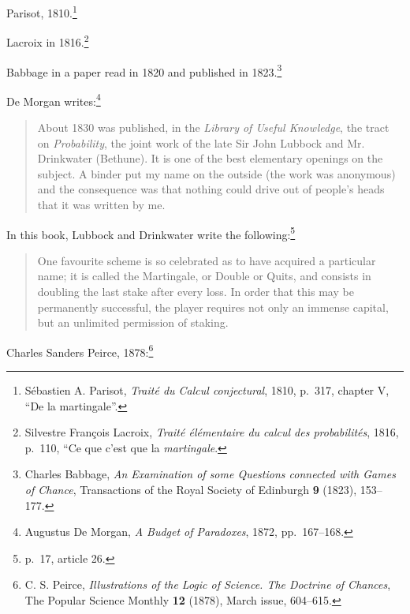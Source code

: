 \documentclass{article}
\theoremstyle{definition}
\begin{document}
Parisot, 1810.\footnote{S\'ebastien A. Parisot, {\em Trait\'e du Calcul conjectural}, 1810, p.~317, chapter V, ``De la martingale''.}

Lacroix in 1816.\footnote{Silvestre Fran\c{c}ois Lacroix, {\em Trait\'e \'el\'ementaire du calcul des probabilit\'es}, 1816,
p.~110, ``Ce que c'est que la {\em martingale}.}

Babbage in a paper read in 1820 and published in 1823.\footnote{Charles Babbage, {\em An Examination of some Questions connected with Games
of Chance}, Transactions of the Royal Society of Edinburgh \textbf{9} (1823), 153--177.}

De Morgan writes:\footnote{Augustus De Morgan, {\em A Budget of Paradoxes}, 1872, pp.~167--168.}
\begin{quote}
About 1830 was published, in the {\em Library of Useful Knowledge}, the tract on {\em Probability}, the joint work
of the late Sir John Lubbock and Mr. Drinkwater (Bethune). It is one of the best elementary openings on the subject.
A binder put my name on the outside (the work was anonymous) and the consequence was that nothing could drive
out of people's heads that it was written by me.
\end{quote}

In this book, Lubbock and Drinkwater write the following:\footnote{p.~17, article 26.}

\begin{quote}
One favourite scheme is so celebrated as to have acquired a particular name; it is called the Martingale, or Double
or Quits, and consists in doubling the last stake after every loss. In order that this may be
permanently successful, the player requires not only an immense capital, but an unlimited permission of staking.
\end{quote}

Charles Sanders Peirce, 1878:\footnote{C. S. Peirce, {\em Illustrations of the Logic of Science. The Doctrine of Chances}, 
The Popular Science Monthly \textbf{12} (1878), March issue, 604--615.}
\end{document}
